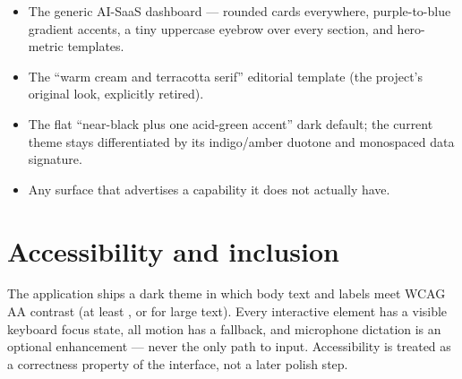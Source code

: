 \begin{itemize}
  \item The generic AI-SaaS dashboard --- rounded cards everywhere, purple-to-blue
        gradient accents, a tiny uppercase eyebrow over every section, and
        hero-metric templates.
  \item The ``warm cream and terracotta serif'' editorial template (the
        project's original look, explicitly retired).
  \item The flat ``near-black plus one acid-green accent'' dark default; the
        current theme stays differentiated by its indigo/amber duotone and
        monospaced data signature.
  \item Any surface that advertises a capability it does not actually have.
\end{itemize}

\section{Accessibility and inclusion}
The application ships a dark theme in which body text and labels meet WCAG AA
contrast (at least , or  for large text). Every
interactive element has a visible keyboard focus state, all motion has a
 fallback, and microphone dictation is an optional
enhancement --- never the only path to input. Accessibility is treated as a
correctness property of the interface, not a later polish step.
